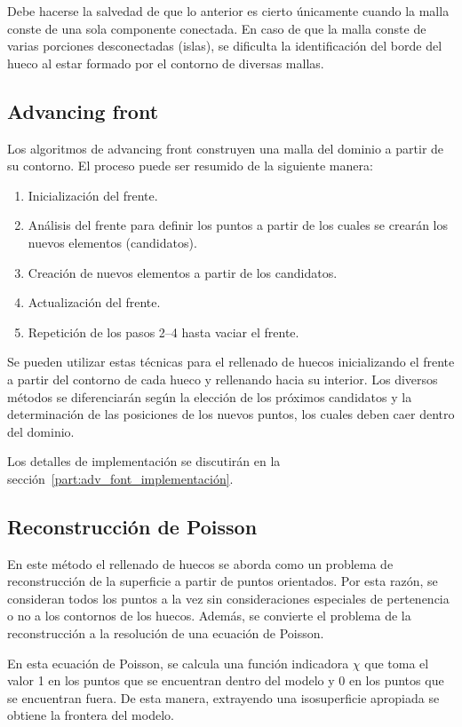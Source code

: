 Debe hacerse la salvedad de que lo anterior es cierto únicamente cuando la malla conste
de una sola componente conectada.
En caso de que la malla conste de varias porciones desconectadas (islas),
se dificulta la identificación del borde del hueco al estar formado por el contorno de diversas mallas.



\subsection{Advancing front}
Los algoritmos de advancing front construyen una malla del dominio a partir de su contorno.
El proceso puede ser resumido de la siguiente manera:
\begin{enumerate}
	\item Inicialización del frente.
	\item Análisis del frente para definir los puntos a partir de los cuales se crearán los nuevos elementos (candidatos).
	\item Creación de nuevos elementos a partir de los candidatos.
	\item Actualización del frente.
	\item Repetición de los pasos 2--4 hasta vaciar el frente.
\end{enumerate}

Se pueden utilizar estas técnicas para el rellenado de huecos
inicializando el frente a partir del contorno de cada hueco
y rellenando hacia su interior.
Los diversos métodos se diferenciarán según la elección de los próximos candidatos
y la determinación de las posiciones de los nuevos puntos,
los cuales deben caer dentro del dominio.

Los detalles de implementación se discutirán en la sección~\ref{part:adv_font_implementación}.

\subsection{Reconstrucción de Poisson}
En este método el rellenado de huecos se aborda como un problema de
reconstrucción de la superficie a partir de puntos orientados.  Por esta
razón, se consideran todos los puntos a la vez sin consideraciones
especiales de pertenencia o no a los contornos de los huecos.
Además, se convierte el problema de la reconstrucción a la resolución de
una ecuación de Poisson.

En esta ecuación de Poisson, se calcula una función indicadora $\chi$
que toma el valor 1 en los puntos que se encuentran dentro del modelo
y 0 en los puntos que se encuentran fuera.
De esta manera, extrayendo una isosuperficie apropiada se obtiene la frontera del modelo.

